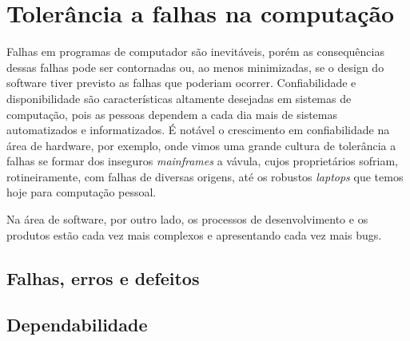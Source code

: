 \section{Tolerância a falhas na computação}
\label{sec:falhas_comp}


Falhas em programas de computador são inevitáveis, porém as consequências dessas falhas pode ser contornadas ou, ao menos minimizadas, se o design do software tiver previsto as falhas que poderiam ocorrer. Confiabilidade e disponibilidade são características altamente desejadas em sistemas de computação, pois as pessoas dependem a cada dia mais de sistemas automatizados e informatizados. É notável o crescimento em confiabilidade na área de hardware, por exemplo, onde vimos uma grande cultura de tolerância a falhas se formar dos inseguros \emph{mainframes} a vávula, cujos proprietários sofriam, rotineiramente, com falhas de diversas origens, até os robustos \emph{laptops} que temos hoje para computação pessoal.

Na área de software, por outro lado, os processos de desenvolvimento e os produtos estão cada vez mais complexos e apresentando cada vez mais bugs. 

\subsection{Falhas, erros e defeitos} %
\label{sub:falhas_erros_e_defeitos}


\subsection{Dependabilidade} %
\label{sub:dependabilidade}


